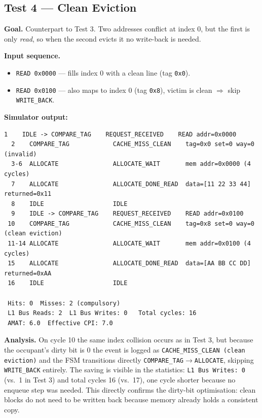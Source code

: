 \documentclass[11pt,a4paper]{article}
\begin{document}
\subsection{Test 4 — Clean Eviction}

\textbf{Goal.} Counterpart to Test 3. Two addresses conflict at index 0, but
the first is only \emph{read}, so when the second evicts it no write-back is
needed.

\textbf{Input sequence.}
\begin{itemize}[leftmargin=1.4em,itemsep=0.05em]
    \item \texttt{READ 0x0000} — fills index 0 with a clean line (tag \texttt{0x0}).
    \item \texttt{READ 0x0100} — also maps to index 0 (tag \texttt{0x8}), victim is clean $\Rightarrow$ skip \texttt{WRITE\_BACK}.
\end{itemize}

\textbf{Simulator output:}
\begin{lstlisting}[style=trace]
  1    IDLE -> COMPARE_TAG    REQUEST_RECEIVED    READ addr=0x0000
  2    COMPARE_TAG            CACHE_MISS_CLEAN    tag=0x0 set=0 way=0 (invalid)
  3-6  ALLOCATE               ALLOCATE_WAIT       mem addr=0x0000 (4 cycles)
  7    ALLOCATE               ALLOCATE_DONE_READ  data=[11 22 33 44] returned=0x11
  8    IDLE                   IDLE
  9    IDLE -> COMPARE_TAG    REQUEST_RECEIVED    READ addr=0x0100
 10    COMPARE_TAG            CACHE_MISS_CLEAN    tag=0x8 set=0 way=0 (clean eviction)
 11-14 ALLOCATE               ALLOCATE_WAIT       mem addr=0x0100 (4 cycles)
 15    ALLOCATE               ALLOCATE_DONE_READ  data=[AA BB CC DD] returned=0xAA
 16    IDLE                   IDLE

 Hits: 0  Misses: 2 (compulsory)
 L1 Bus Reads: 2  L1 Bus Writes: 0   Total cycles: 16
 AMAT: 6.0  Effective CPI: 7.0
\end{lstlisting}

\textbf{Analysis.} On cycle 10 the same index collision occurs as in Test 3,
but because the occupant's dirty bit is 0 the event is logged as
\texttt{CACHE\_MISS\_CLEAN (clean eviction)} and the FSM transitions directly
\texttt{COMPARE\_TAG}$\to$\texttt{ALLOCATE}, skipping \texttt{WRITE\_BACK}
entirely. The saving is visible in the statistics: \texttt{L1 Bus Writes: 0}
(vs.\ 1 in Test 3) and total cycles 16 (vs.\ 17), one cycle shorter because
no enqueue step was needed. This directly confirms the dirty-bit
optimisation: clean blocks do not need to be written back because memory
already holds a consistent copy.
\end{document}
